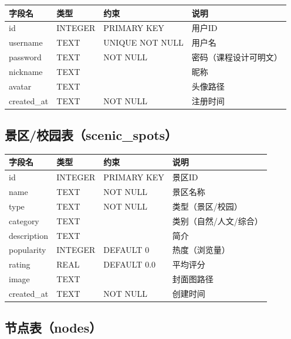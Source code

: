 \documentclass[12pt,a4paper]{report}
\begin{document}
\begin{table}[H]
\centering
\small
\begin{tabular}{llll}
\toprule
\textbf{字段名} & \textbf{类型} & \textbf{约束} & \textbf{说明} \\
\midrule
id & INTEGER & PRIMARY KEY & 用户ID \\
username & TEXT & UNIQUE NOT NULL & 用户名 \\
password & TEXT & NOT NULL & 密码（课程设计可明文） \\
nickname & TEXT & & 昵称 \\
avatar & TEXT & & 头像路径 \\
created\_at & TEXT & NOT NULL & 注册时间 \\
\bottomrule
\end{tabular}
\end{table}

\subsection{景区/校园表（scenic\_spots）}

\begin{table}[H]
\centering
\small
\begin{tabular}{llll}
\toprule
\textbf{字段名} & \textbf{类型} & \textbf{约束} & \textbf{说明} \\
\midrule
id & INTEGER & PRIMARY KEY & 景区ID \\
name & TEXT & NOT NULL & 景区名称 \\
type & TEXT & NOT NULL & 类型（景区/校园） \\
category & TEXT & & 类别（自然/人文/综合） \\
description & TEXT & & 简介 \\
popularity & INTEGER & DEFAULT 0 & 热度（浏览量） \\
rating & REAL & DEFAULT 0.0 & 平均评分 \\
image & TEXT & & 封面图路径 \\
created\_at & TEXT & NOT NULL & 创建时间 \\
\bottomrule
\end{tabular}
\end{table}

\subsection{节点表（nodes）}
\end{document}
